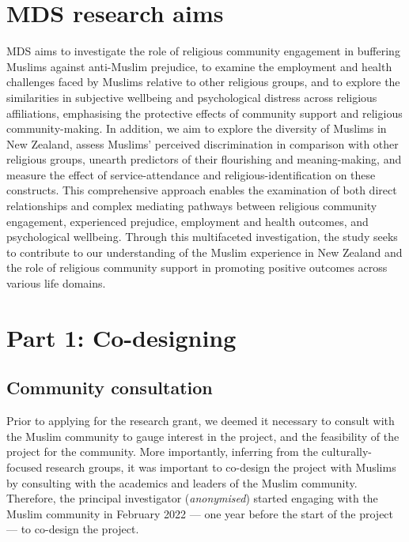 \documentclass[
]{interact}
\begin{document}
\section{MDS research aims}\label{mds-research-aims}

MDS aims to investigate the role of religious community engagement in
buffering Muslims against anti-Muslim prejudice, to examine the
employment and health challenges faced by Muslims relative to other
religious groups, and to explore the similarities in subjective
wellbeing and psychological distress across religious affiliations,
emphasising the protective effects of community support and religious
community-making. In addition, we aim to explore the diversity of
Muslims in New Zealand, assess Muslims' perceived discrimination in
comparison with other religious groups, unearth predictors of their
flourishing and meaning-making, and measure the effect of
service-attendance and religious-identification on these constructs.
This comprehensive approach enables the examination of both direct
relationships and complex mediating pathways between religious community
engagement, experienced prejudice, employment and health outcomes, and
psychological wellbeing. Through this multifaceted investigation, the
study seeks to contribute to our understanding of the Muslim experience
in New Zealand and the role of religious community support in promoting
positive outcomes across various life domains.

\section{Part 1: Co-designing}\label{part-1-co-designing}

\subsection{Community consultation}\label{community-consultation}

Prior to applying for the research grant, we deemed it necessary to
consult with the Muslim community to gauge interest in the project, and
the feasibility of the project for the community. More importantly,
inferring from the culturally-focused research groups, it was important
to co-design the project with Muslims by consulting with the academics
and leaders of the Muslim community. Therefore, the principal
investigator (\emph{anonymised}) started engaging with the Muslim
community in February 2022 --- one year before the start of the project
--- to co-design the project.
\end{document}
